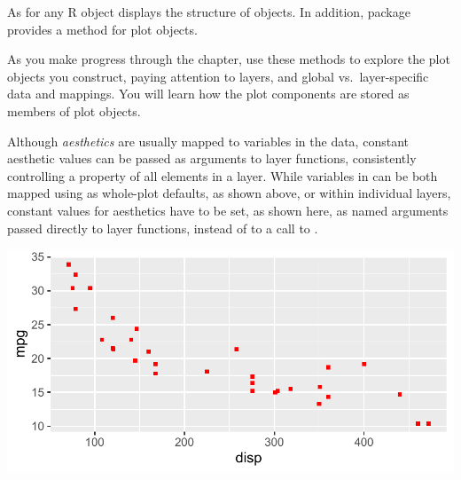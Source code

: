 \documentclass[krantz2]{krantz}\usepackage{knitr}
\begin{document}
\begin{advplayground}
As for any R object  displays the structure of  objects. In addition, package  provides a  method for  plot objects.

As you make progress through the chapter, use these methods to explore the  plot objects you construct, paying attention to layers, and global vs.\ layer-specific data and mappings. You will learn how the plot components are stored as members of  plot objects.
\end{advplayground}

Although \emph{aesthetics} are usually mapped to variables in the data, constant aesthetic values can be passed as arguments to layer functions, consistently controlling a property of all elements in a layer. While variables in  can be both mapped using  as whole-plot defaults, as shown above, or within individual layers, constant values for aesthetics have to be set, as shown here, as named arguments passed directly to layer functions, instead of to a call to .

\begin{knitrout}\footnotesize
{}\color{fgcolor}\begin{kframe}
\begin{alltt}
\hlstd{(} 
        \hlstd{=} \hlstd{(}    \hlopt{+}
  \hlstd{(} \hlstd{=} \hlstd{,}  \hlstd{=} \hlstd{)}
\end{alltt}
\end{kframe}

{\centering \includegraphics[width=.7\textwidth]{figure/pos-ggplot-basics-04a-1} 

}


\end{knitrout}
\end{document}

